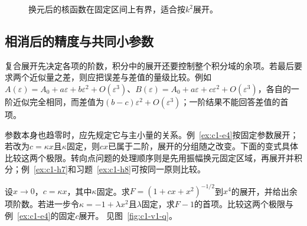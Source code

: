 \begin{solution}
\begin{figure}[H]\centering
{}
\caption{换元后的核函数在固定区间上有界，适合按$k^2$展开。}\label{fig:c1-h7-s}
\end{figure}
\end{solution}

\subsection{相消后的精度与共同小参数}
复合展开先决定各项的阶数，积分中的展开还要控制整个积分域的余项。若最后要求两个近似量之差，则应把误差与差值的量级比较。例如$A(\varepsilon)=A_0+a\varepsilon+b\varepsilon^2+O(\varepsilon^3)$、$B(\varepsilon)=A_0+a\varepsilon+c\varepsilon^2+O(\varepsilon^3)$，各自的一阶近似完全相同，而差值为$(b-c)\varepsilon^2+O(\varepsilon^3)$；一阶结果不能回答差值的首项。

参数本身也趋零时，应先规定它与主小量的关系。例~\ref{ex:c1-e4}按固定参数展开；若改为$c=\kappa x$且$\kappa$固定，则$cx$已属于二阶，展开的分组随之改变。下面的变式具体比较这两个极限。转向点问题的处理顺序则是先用振幅换元固定区域，再展开并积分；例~\ref{ex:c1-h7}和习题~\ref{ex:c1-h8}可按同一原则比较。



\begin{exercise}[同时变小的参数]\label{ex:c1-v1}

设$x\to0$，$c=\kappa x$，其中$\kappa$固定。求$F=(1+cx+x^2)^{-1/2}$到$x^4$的展开，并给出余项阶数。若进一步令$\kappa=-1+\lambda x^2$且$\lambda$固定，求$F-1$的首项。比较这两个极限与例~\ref{ex:c1-e4}的固定$c$展开。 见图~\ref{fig:c1-v1-q}。
\end{exercise}

